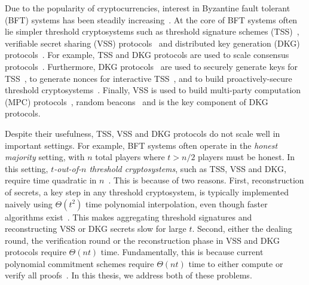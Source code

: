 
Due to the popularity of cryptocurrencies, interest in Byzantine fault tolerant (BFT) systems has been steadily increasing~\cite{bitcoin,ethereum,GAG+19,algorand,dfinity,ouroboros,ouroboros-praos,ouroboros-genesis,randherd}.
At the core of BFT systems often lie simpler threshold cryptosystems such as threshold signature schemes (TSS)~\cite{Boldyreva03,Shoup00}, verifiable secret sharing (VSS) protocols~\cite{Pedersen1991Non,CGMA85,KZG10a} and distributed key generation (DKG) protocols~\cite{Pedersen1991AThreshold,GJKR07,Kate2010}.
For example, TSS and DKG protocols are used to scale consensus protocols~\cite{GAG+19,dfinity,constantinople}.
Furthermore, DKG protocols~\cite{GJKR07} are used to securely generate keys for TSS~\cite{KG09}, to generate nonces for interactive TSS~\cite{SS01,GGN16}, and to build proactively-secure threshold cryptosystems~\cite{Herzberg1995ProactiveSecret,Herzberg1997ProactivePublic}.
Finally, VSS is used to build multi-party computation (MPC) protocols~\cite{GRR98p}, random beacons~\cite{randherd,CD17a,ouroboros} and is the key component of DKG protocols.

Despite their usefulness, TSS, VSS and DKG protocols do not scale well in important settings.
For example, BFT systems often operate in the \textit{honest majority} setting, with $n$ total players where $t > n/2$ players must be honest.
In this setting, \textit{$t$-out-of-$n$ threshold cryptosystems}, such as TSS, VSS and DKG, require time quadratic in $n$~\cite{Feldman87,Pedersen1991Non,KZG10a,Boldyreva03}.
This is because of two reasons.
First, reconstruction of secrets, a key step in any threshold cryptosystem, is typically implemented naively using $\Theta(t^2)$ time polynomial interpolation, even though faster algorithms exist~\cite{vG13ModernCh10}.
This makes aggregating threshold signatures and reconstructing VSS or DKG secrets slow for large $t$.
Second, either the dealing round, the verification round or the reconstruction phase in VSS and DKG protocols require $\Theta(nt)$ time.
Fundamentally, this is because current polynomial commitment schemes require $\Theta(nt)$ time to either compute or verify all proofs~\cite{Feldman87,Pedersen1991Non,KZG10a}.
In this thesis, we address both of these problems.

